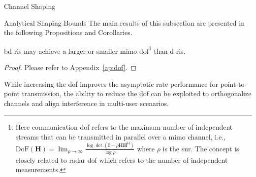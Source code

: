 \documentclass[journal]{IEEEtran}
\begin{document}
\begin{section}{Channel Shaping}
	\begin{subsection}{Analytical Shaping Bounds}
		\label{sc:shaping_analytical}
		The main results of this subsection are presented in the following Propositions and Corollaries.
		\begin{proposition}
			\label{pp:dof}
			\gls{bd}-\gls{ris} may achieve a larger or smaller \gls{mimo} \gls{dof}\footnote{Here communication \gls{dof} refers to the maximum number of independent streams that can be transmitted in parallel over a \gls{mimo} channel, i.e., $\mathrm{DoF}(\mathbf{H}) = \lim_{\rho \to \infty} \frac{\log \det(\mathbf{I} + \rho \mathbf{H} \mathbf{H}^\mathsf{H})}{\log \rho}$ where $\rho$ is the \gls{snr}. The concept is closely related to radar \gls{dof} which refers to the number of independent measurements.} than \gls{d}-\gls{ris}.
		\end{proposition}
		\begin{proof}
			Please refer to Appendix~\ref{ap:dof}.
		\end{proof}

		While increasing the \gls{dof} improves the asymptotic rate performance for point-to-point transmission, the ability to reduce the \gls{dof} can be exploited to orthogonalize channels and align interference in multi-user scenarios.


\end{subsection}
\end{section}
\end{document}

